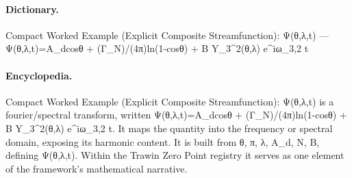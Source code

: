 \paragraph{Dictionary.}
Compact Worked Example (Explicit Composite Streamfunction): Ψ(θ,λ,t) — Ψ(θ,λ,t)=A\_dcosθ + (Γ\_N)/(4π)ln(1-cosθ) + B Y\_3\textasciicircum{}2(θ,λ) e\textasciicircum{}iω\_3,2 t

\paragraph{Encyclopedia.}
Compact Worked Example (Explicit Composite Streamfunction): Ψ(θ,λ,t) is a fourier/spectral transform, written Ψ(θ,λ,t)=A\_dcosθ + (Γ\_N)/(4π)ln(1-cosθ) + B Y\_3\textasciicircum{}2(θ,λ) e\textasciicircum{}iω\_3,2 t. It maps the quantity into the frequency or spectral domain, exposing its harmonic content. It is built from θ, π, λ, A\_d, N, B, defining Ψ(θ,λ,t). Within the Trawin Zero Point registry it serves as one element of the framework's mathematical narrative.
